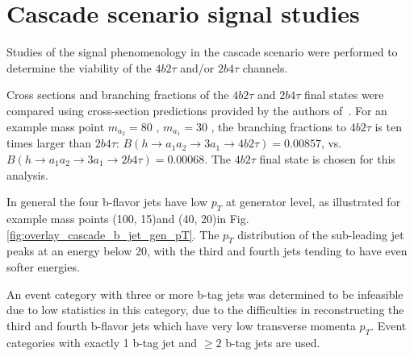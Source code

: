 \section{Cascade scenario signal studies}
\label{section:a1a2_gen_studies}
Studies of the signal phenomenology in the cascade scenario were performed to determine the viability of the $4b2\tau$ and/or $2b4\tau$ channels. 

Cross sections and branching fractions of the $4b2\tau$ and $2b4\tau$ final states were compared using cross-section predictions provided by the authors of~\cite{Robens:2019kga}. For an example mass point $m_{a_2} = 80$ \GeV, $m_{a_1} = 30$ \GeV, the branching fractions to $4b2\tau$ is ten times larger than $2b4\tau$: $B(h \rightarrow a_1 a_2 \rightarrow 3 a_1 \rightarrow 4b2\tau) = 0.00857$, vs. $B(h \rightarrow a_1 a_2 \rightarrow 3 a_1 \rightarrow 2b4\tau) = 0.00068$. The $4b2\tau$ final state is chosen for this analysis.

In general the four b-flavor jets have low $p_{T}$ at generator level, as illustrated for example mass points (100, 15)\GeV and (40, 20)\GeV in Fig. \ref{fig:overlay_cascade_b_jet_gen_pT}. The $p_{T}$ distribution of the sub-leading jet peaks at an energy below 20\GeV, with the third and fourth jets tending to have even softer energies.

An event category with three or more b-tag jets was determined to be infeasible due to low statistics in this category, due to the difficulties in reconstructing the third and fourth b-flavor jets which have very low transverse momenta $p_{T}$. Event categories with exactly 1 b-tag jet and $\geq 2$ b-tag jets are used.

